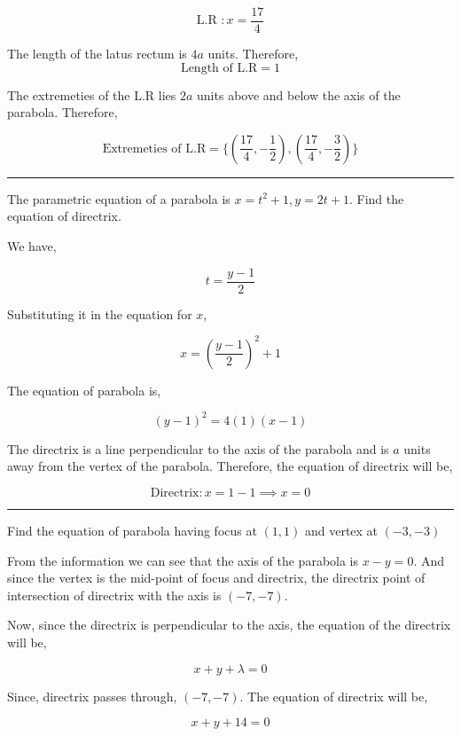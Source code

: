 \documentclass[twocolumn]{article}
\begin{document}
\begin{CJK*}{UTF8}{gbsn}
\[
    \text{L.R } : \boxed{x = \frac{17}{4}}
\]

The length of the latus rectum is \(4a\) units. Therefore, 
\[
    \boxed{\text{Length of L.R} = 1}
\]

The extremeties of the L.R lies \(2a\) units above and below the axis of the parabola. Therefore, 

\[
    \text{Extremeties of L.R} = \boxed{\{(\frac{17}{4}, -\frac{1}{2}), (\frac{17}{4}, -\frac{3}{2})\}}
\]

\hrule 

\begin{question}
    The parametric equation of a parabola is \(x  = t^{2} +1, y = 2t + 1\). Find the equation of directrix. 
\end{question}

We have, 

\[
    t = \frac{y-1}{2}
\]

Substituting it in the equation for \(x\), 

\[
    x = (\frac{y-1}{2})^{2} + 1
\]

The equation of parabola is, 

\[
    (y-1)^{2} = 4(1)(x-1)
\]

The directrix is a line perpendicular to the axis of the parabola and is \(a\) units away from the vertex of the parabola. Therefore, the equation of directrix will be, 

\[
    \boxed{\text{Directrix}: x = 1-1 \implies x = 0} 
\]

\hrule

\begin{question}
    Find the equation of parabola having focus at \((1, 1)\) and vertex at \((-3, -3)\) 
\end{question}

From the information we can see that the axis of the parabola is \(x-y = 0\). And since the vertex is the mid-point of focus and directrix, the directrix point of intersection of directrix with the axis is \((-7, -7)\).

\vspace*{0.1in}

Now, since the directrix is perpendicular to the axis, the equation of the directrix will be, 

\[
    x + y + \lambda = 0 
\]

Since, directrix passes through, \((-7,-7)\). The equation of directrix will be, 

\[
    x+y + 14 = 0
\]


\end{CJK*}
\end{document}
